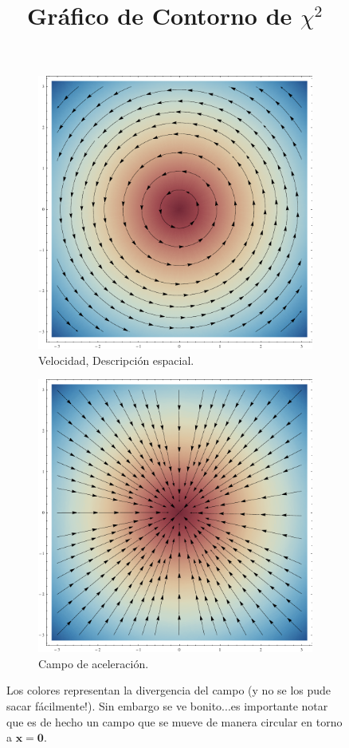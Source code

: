 \documentclass[10pt,a4paper]{article}
\theoremstyle{definition}
\begin{document}
\begin{figure}[h!]
\begin{subfigure}{.50\textwidth}
  \centering
 \title{Gráfico de Contorno de $\chi^2$}  
  \includegraphics[width=1\linewidth]{vel6.pdf}
  \caption{Velocidad, Descripción espacial.}
  \label{gconto}
\end{subfigure}%
\begin{subfigure}{.50\textwidth}
\title{} 
  \centering
   \includegraphics[width=1\linewidth]{acel6.pdf}
  \caption{Campo de aceleración.}
  \label{gtresd}
\end{subfigure}
\caption{Los colores representan la divergencia del campo  (y no se los pude sacar fácilmente!). Sin embargo se ve bonito...es importante notar que es de hecho un campo que se mueve de manera circular en torno a $\mathbf{x = \mathbf{0}}$.}
\end{figure}
\end{document}
